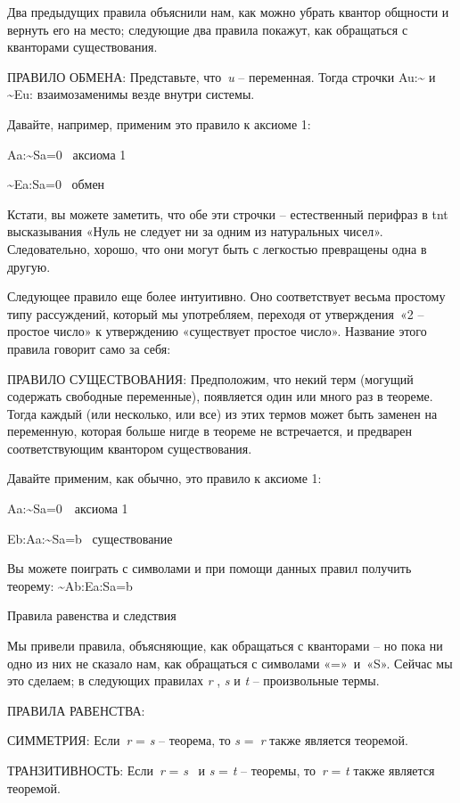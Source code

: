 \documentclass[../main.tex]{subfiles}
\begin{document}
Два предыдущих правила объяснили нам, как можно убрать квантор общности и вернуть его на место; следующие два правила покажут, как обращаться с кванторами существования.

ПРАВИЛО ОБМЕНА: Представьте, что~\emph{u} \--- переменная. Тогда строчки Au:\textasciitilde{} и \textasciitilde Eu: взаимозаменимы везде внутри системы.

Давайте, например, применим это правило к аксиоме 1:

Aa:\textasciitilde Sa=0~ аксиома 1

\textasciitilde Ea:Sa=0~ обмен

Кстати, вы можете заметить, что обе эти строчки \--- естественный перифраз в \acs{tnt} высказывания «Нуль не следует ни за одним из натуральных чисел». Следовательно, хорошо, что они могут быть с легкостью превращены одна в другую.

Следующее правило еще более интуитивно. Оно соответствует весьма простому типу рассуждений, который мы употребляем, переходя от утверждения~«2 \--- простое число» к утверждению «существует простое число». Название этого правила говорит само за себя:

ПРАВИЛО СУЩЕСТВОВАНИЯ: Предположим, что некий терм (могущий содержать свободные переменные), появляется один или много раз в теореме. Тогда каждый (или несколько, или все) из этих термов может быть заменен на переменную, которая больше нигде в теореме не встречается, и предварен соответствующим квантором существования.

Давайте применим, как обычно, это правило к аксиоме 1:

Aa:\textasciitilde Sa=0~~аксиома 1~

Eb:Aa:\textasciitilde Sa=b ~существование

Вы можете поиграть с символами и при помощи данных правил получить теорему: \textasciitilde Ab:Ea:Sa=b

Правила равенства и следствия

Мы привели правила, объясняющие, как обращаться с кванторами \--- но пока ни одно из них не сказало нам, как обращаться с символами «=»~и~«S». Сейчас мы это сделаем; в следующих правилах \emph{r} , \emph{s} и \emph{t} \--- произвольные термы.

ПРАВИЛА РАВЕНСТВА:

СИММЕТРИЯ: Если~\emph{r} = \emph{s} \--- теорема, то \emph{s} =~\emph{r} также является теоремой.

ТРАНЗИТИВНОСТЬ: Если~\emph{r} = \emph{s} ~и \emph{s} = \emph{t} \--- теоремы, то~\emph{r} = \emph{t} также является теоремой.
\end{document}
